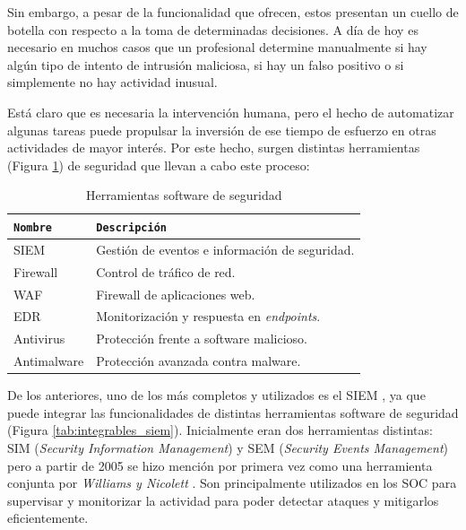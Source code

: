 Sin embargo, a pesar de la funcionalidad que ofrecen, estos presentan un cuello de botella con respecto a la toma de determinadas decisiones. A día de hoy es necesario en muchos casos que un profesional determine manualmente si hay algún tipo de intento de intrusión maliciosa, si hay un falso positivo o si simplemente no hay actividad inusual.

Está claro que es necesaria la intervención humana, pero el hecho de automatizar algunas tareas puede propulsar la inversión de ese tiempo de esfuerzo en otras actividades de mayor interés. Por este hecho, surgen distintas herramientas (Figura \ref{tab:herramientas_independientes}) de seguridad que llevan a cabo este proceso:

\vspace{0.2cm}

\begin{table}[h]
    \centering
    \footnotesize
    \begin{tabular}{|l|p{10cm}|}
        \hline
        \rowcolor{graylight}\texttt{Nombre} & \texttt{Descripción} \\
        \hline
        \gls{SIEM} & Gestión de eventos e información de seguridad. \\
        \hline
        Firewall & Control de tráfico de red. \\
        \hline
        \gls{WAF} & Firewall de aplicaciones web. \\
        \hline
        \gls{EDR} & Monitorización y respuesta en \textit{endpoints}\footnotemark.  \\
        \hline
        Antivirus & Protección frente a software malicioso. \\
        \hline
        Antimalware & Protección avanzada contra malware. \\
        \hline
    \end{tabular}
    \caption{Herramientas software de seguridad}
    \label{tab:herramientas_independientes}
\end{table}


De los anteriores, uno de los más completos y utilizados es el \gls{SIEM} \cite{siemibm2024}, ya que puede integrar las funcionalidades de distintas herramientas software de seguridad (Figura \ref{tab:integrables_siem}). Inicialmente eran dos herramientas distintas: \gls{SIM} (\textit{Security Information Management}) y \gls{SEM} (\textit{Security Events Management}) pero a partir de 2005 se hizo mención por primera vez como una herramienta conjunta por \textit{Williams y Nicolett} \cite{williams2005improve}. Son principalmente utilizados en los \gls{SOC} para supervisar y monitorizar la actividad para poder detectar ataques y mitigarlos eficientemente. 

